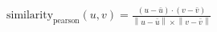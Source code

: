 \documentclass{standalone}
\newcommand{\norm}[1]{\left\lVert#1\right\rVert}
\begin{document}
\( \text{similarity}_{\text{pearson}}(u,v) = \frac{ (u - \bar{u}) \cdot (v - \bar{v})}{\norm{u - \bar{u}} \times \norm{v-\bar{v}}} \)
\end{document}
